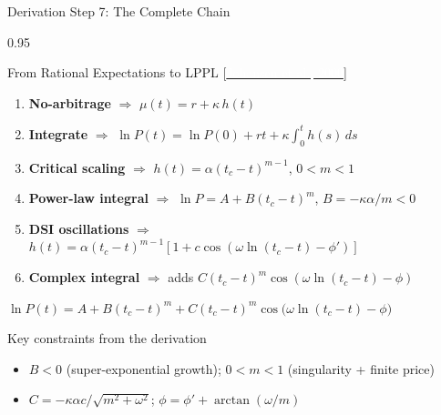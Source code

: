 \documentclass[9pt, aspectratio=169, t]{beamer}
\begin{document}
\begin{frame}{Derivation Step 7: The Complete Chain}
    \begin{cminipage}{0.95\textwidth}
    {\footnotesize
    \begin{block}{From Rational Expectations to LPPL {\scriptsize[\href{https://doi.org/10.48550/arXiv.cond-mat/9903321}{\textcolor{white}{Johansen et al., 2000}}]}}
        \begin{enumerate}\setlength{\itemsep}{0pt}
            \item \textbf{No-arbitrage} $\Rightarrow$ $\mu(t) = r + \kappa\,h(t)$
            \item \textbf{Integrate} $\Rightarrow$ $\ln P(t) = \ln P(0) + rt + \kappa\!\int_0^t h(s)\,ds$
            \item \textbf{Critical scaling} $\Rightarrow$ $h(t) = \alpha(t_c - t)^{m-1}$, \;$0 < m < 1$
            \item \textbf{Power-law integral} $\Rightarrow$ $\ln P = A + B(t_c-t)^m$, \;$B = -\kappa\alpha/m < 0$
            \item \textbf{DSI oscillations} $\Rightarrow$ $h(t) = \alpha(t_c{-}t)^{m-1}[1 + c\cos(\omega\ln(t_c{-}t) {-} \phi')]$
            \item \textbf{Complex integral} $\Rightarrow$ adds $C(t_c{-}t)^m\cos(\omega\ln(t_c{-}t) - \phi)$
        \end{enumerate}
    \end{block}
    \vspace{-2mm}
    \begin{exampleblock}{}
        \vspace{-1mm}
        \begin{center}
            \large $\boxed{\ln P(t) = A + B(t_c - t)^m + C(t_c - t)^m \cos\bigl(\omega \ln(t_c - t) - \phi\bigr)}$
        \end{center}
        \vspace{-2mm}
    \end{exampleblock}
    \vspace{-2mm}
    \begin{alertblock}{Key constraints from the derivation}
        \begin{itemize}\setlength{\itemsep}{0pt}
            \item $B < 0$ (super-exponential growth); \; $0 < m < 1$ (singularity + finite price)
            \item $C = -\kappa\alpha c/\sqrt{m^2{+}\omega^2}$; \; $\phi = \phi' + \arctan(\omega/m)$
        \end{itemize}
    \end{alertblock}
    }
    \end{cminipage}
\end{frame}
\end{document}
